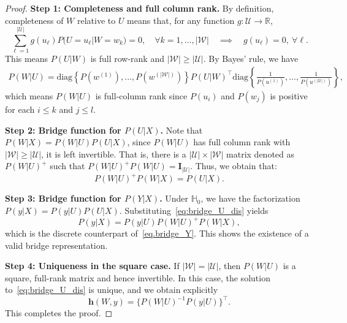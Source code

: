 \documentclass[
  12pt]{article}
\def\to{\rightarrow}
\def\h{\mathbf{h}}
\def\I{\mathbf{I}}
\def\mH{\mathbb{H}}
\def\cU{\mathcal{U}}
\def\cW{\mathcal{W}}
\begin{document}
\DiscreteBridge*
\begin{proof}
\noindent\textbf{Step 1: Completeness and full column rank.}
By definition, completeness of $W$ relative to $U$ means that, for any function $g:\mathcal{U}\to\mathbb{R}$,
$$
\sum_{\ell=1}^{|\mathcal{U}|} g(u_\ell)P(U=u_\ell | W=w_k) = 0, 
\quad \forall k=1,...,|\mathcal{W}|
\quad \implies \quad g(u_\ell) = 0,\ \forall \ell.
$$
This means $P(U | W)$ is full row-rank and $|\cW| \geq |\cU|$. By Bayes' rule, we have 
\begin{align*}
    P(W|U) = \mathrm{diag}\left\{ P(w^{(1)}),...,P(w^{(|\cW|)}) \right\} P(U|W)^\top \mathrm{diag}\left\{ \frac{1}{P(u^{(1)})},...,\frac{1}{P(u^{(|\cU|)})} \right\},
\end{align*}
which means $P(W|U)$ is full-column rank since $P(u_i)$ and $P(w_j)$ is positive for each $i \leq k$ and $j \leq l$. 

\noindent\textbf{Step 2: Bridge function for $P(U | X)$.}
Note that $P(W|X)=P(W|U)P(U|X)$, since $P(W | U)$ has full column rank with $|\mathcal{W}|\ge|\mathcal{U}|$, it is left invertible. That is, there is a $|\mathcal{U}|\times |\mathcal{W}|$ matrix denoted as $P(W | U)^{+}$ such that $P(W | U)^{+}P(W | U)=\I_{|\mathcal{U}|}$. Thus, we obtain that:
\begin{equation}\label{eq:bridge_U_dis}
    P(W | U)^{+} P(W | X) = P(U | X).
\end{equation}

\noindent\textbf{Step 3: Bridge function for $P(Y | X)$.}
Under $\mH_0$, we have the factorization $P(y | X) = P(y | U)P(U | X)$. 
Substituting~\eqref{eq:bridge_U_dis} yields
\begin{equation}\label{eq:bridge_Y_dis}
    P(y | X) = P(y | U) P(W | U)^{+} P(W | X),
\end{equation}
which is the discrete counterpart of~\eqref{eq.bridge_Y}. 
This shows the existence of a valid bridge representation.

\noindent\textbf{Step 4: Uniqueness in the square case.}
If $|\mathcal{W}| = |\mathcal{U}|$, then $P(W | U)$ is a square, full-rank matrix and hence invertible. 
In this case, the solution to~\eqref{eq:bridge_U_dis} is unique, and we obtain explicitly
$$
\h(W,y)  = \{P(W | U)^{-1}P(y | U)\}^\top.
$$
This completes the proof.
\end{proof}
\end{document}
